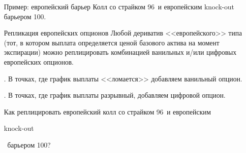 \documentclass{beamer}
\newcommand{\en}[1]{\begin{otherlanguage}{english}#1\end{otherlanguage}}
\newcommand{\usdrubstrike}{96}
\newcommand{\usdrubbarrier}{100}
\begin{document}
\begin{frame}{Пример: европейский барьер}
\justify
Колл со страйком \usdrubstrike\ и европейским knock-out барьером \usdrubbarrier.

\centering
\end{frame}



\begin{frame}{Репликация европейских опционов}
\justify
Любой дериватив <<европейского>> типа (тот, в котором выплата определяется ценой 
базового актива на момент экспирации) можно реплицировать комбинацией ванильных и/или
цифровых европейских опционов.

. В точках, где график выплаты <<ломается>> добавляем ванильный опцион.

. В точках, где график выплаты разрывный, добавляем цифровой опцион.

\justify
Как реплицировать европейский колл со страйком \usdrubstrike\ и европейским \en{knock-out}\
барьером \usdrubbarrier?
\end{frame}
\end{document}
